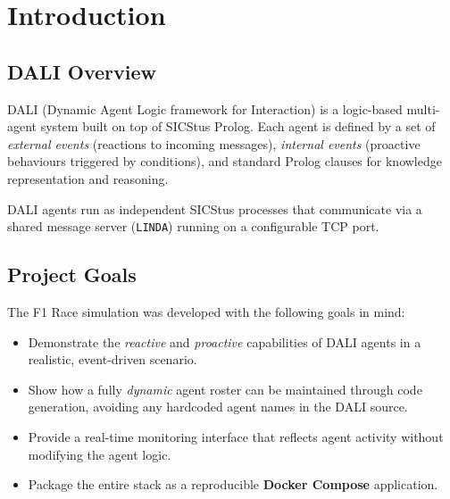 \section{Introduction}

\subsection{DALI Overview}
DALI (Dynamic Agent Logic framework for Interaction) is a logic-based multi-agent system
built on top of SICStus Prolog. Each agent is defined by a set of \emph{external events}
(reactions to incoming messages), \emph{internal events} (proactive behaviours triggered by
conditions), and standard Prolog clauses for knowledge representation and reasoning.

DALI agents run as independent SICStus processes that communicate via a shared message
server (\texttt{LINDA}) running on a configurable TCP port.

\subsection{Project Goals}
The F1 Race simulation was developed with the following goals in mind:
\begin{itemize}[leftmargin=2em]
  \item Demonstrate the \emph{reactive} and \emph{proactive} capabilities of DALI agents in
        a realistic, event-driven scenario.
  \item Show how a fully \emph{dynamic} agent roster can be maintained through code
        generation, avoiding any hardcoded agent names in the DALI source.
  \item Provide a real-time monitoring interface that reflects agent activity without
        modifying the agent logic.
  \item Package the entire stack as a reproducible \textbf{Docker Compose} application.
\end{itemize}

